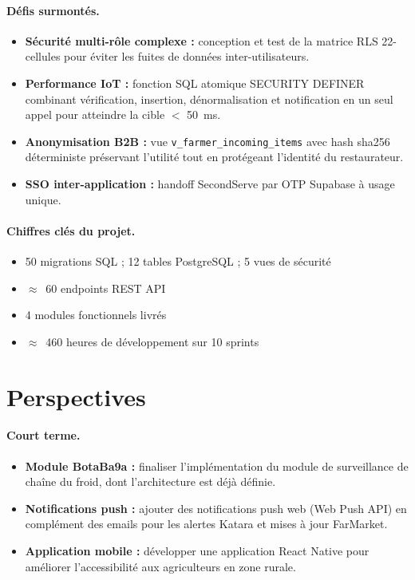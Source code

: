 \documentclass[12pt,a4paper]{report}
\newcommand{\code}[1]{\texttt{\small #1}}
\begin{document}
\paragraph{Défis surmontés.}
\begin{itemize}
  \item \textbf{Sécurité multi-rôle complexe :} conception et test de la matrice RLS
        22-cellules pour éviter les fuites de données inter-utilisateurs.
  \item \textbf{Performance IoT :} fonction SQL atomique SECURITY DEFINER combinant
        vérification, insertion, dénormalisation et notification en un seul appel pour
        atteindre la cible $<$ 50~ms.
  \item \textbf{Anonymisation B2B :} vue \code{v\_farmer\_incoming\_items} avec hash
        sha256 déterministe préservant l'utilité tout en protégeant l'identité du
        restaurateur.
  \item \textbf{SSO inter-application :} handoff SecondServe par OTP Supabase à usage
        unique.
\end{itemize}

\paragraph{Chiffres clés du projet.}
\begin{itemize}
  \item 50 migrations SQL ; 12 tables PostgreSQL ; 5 vues de sécurité
  \item $\approx$~60 endpoints REST API
  \item 4 modules fonctionnels livrés
  \item $\approx$~460 heures de développement sur 10 sprints
\end{itemize}

\section{Perspectives}

\paragraph{Court terme.}
\begin{itemize}
  \item \textbf{Module BotaBa9a :} finaliser l'implémentation du module de surveillance
        de chaîne du froid, dont l'architecture est déjà définie.
  \item \textbf{Notifications push :} ajouter des notifications push web (Web Push API)
        en complément des emails pour les alertes Katara et mises à jour FarMarket.
  \item \textbf{Application mobile :} développer une application React Native pour
        améliorer l'accessibilité aux agriculteurs en zone rurale.
\end{itemize}
\end{document}
